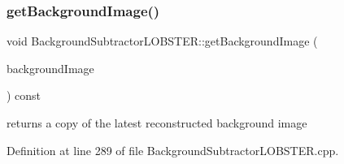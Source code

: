 \subsubsection{\texorpdfstring{get\+Background\+Image()}{getBackgroundImage()}}
{\footnotesize\ttfamily void Background\+Subtractor\+L\+O\+B\+S\+T\+E\+R\+::get\+Background\+Image (\begin{DoxyParamCaption}\item[{cv\+::\+Output\+Array}]{background\+Image }\end{DoxyParamCaption}) const}



returns a copy of the latest reconstructed background image 



Definition at line 289 of file Background\+Subtractor\+L\+O\+B\+S\+T\+E\+R.\+cpp.


